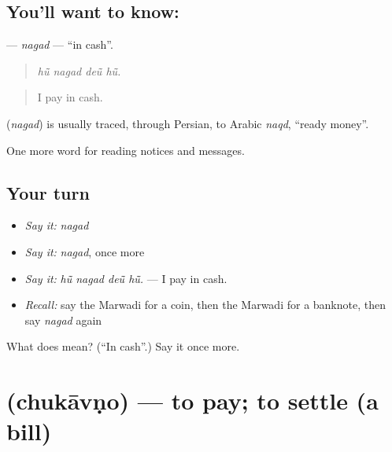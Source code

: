 \subsection*{You'll want to know: }
\textbf{} — \emph{nagad} — \textquotedblleft{}in cash\textquotedblright{}.

\begin{quote}
   
\end{quote}

\begin{quote}
\emph{hū̃ nagad deū̃ hū̃.}
\end{quote}

\begin{quote}
I pay in cash.
\end{quote}

\begin{cousinweb}
\textbf{} (\emph{nagad}) is usually traced, through Persian, to Arabic \emph{naqd}, \textquotedblleft{}ready money\textquotedblright{}.
\end{cousinweb}

\begin{grammarlens}[title={What you've built}]
One more word for reading notices and messages.
\end{grammarlens}

\subsection*{Your turn}
\begin{itemize}
\raggedright
  \item \emph{Say it:} \emph{nagad}
  \item \emph{Say it:} \emph{nagad}, once more
  \item \emph{Say it:} \emph{hū̃ nagad deū̃ hū̃.} — I pay in cash.
  \item \emph{Recall:} say the Marwadi for a coin, then the Marwadi for a banknote, then say \emph{nagad} again
\end{itemize}

\begin{tcolorbox}[breakable,colback=teal!4,colframe=teal!35!black,title={Before you move on}]
What does  mean? (\textquotedblleft{}In cash\textquotedblright{}.) Say it once more.
\end{tcolorbox}
\section[\texorpdfstring{\mw{चुकावणो} (chukāvṇo)}{चुकावणो (chukāvṇo)}]{ (chukāvṇo) — to pay; to settle (a bill)}

